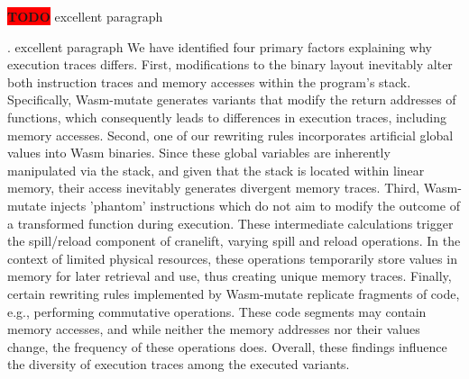 \documentclass[sigplan,screen]{acmart}
\newcommand*\badge[1]{ \colorbox{red}{\color{white}#1}}
\newcommand{\tool}{Wasm-mutate\xspace}
\newcommand{\wasm}{Wasm\xspace}
\newcommand{\todo}[1]{%
\refstepcounter{todo}
\noindent\textbf{\badge{TODO}} {\color{red}#1}
\addcontentsline{td}{todo}
{\color{red}\thesection.\thetodo\xspace #1}}
\begin{document}
\todo{excellent paragraph}
We have identified four primary factors explaining why execution traces differs.
First, modifications to the binary layout inevitably alter both instruction traces and memory accesses within the program's stack. 
Specifically, \tool generates variants that modify the return addresses of functions, which consequently leads to differences in execution traces, including memory accesses.
Second, one of our rewriting rules incorporates artificial global values into \wasm binaries. 
Since these global variables are inherently manipulated via the stack, and given that the stack is located within linear memory, their access inevitably generates divergent memory traces.
Third, \tool injects 'phantom' instructions which do not aim to modify the outcome of a transformed function during execution. 
These intermediate calculations trigger the spill/reload component of cranelift, varying spill and reload operations. 
In the context of limited physical resources, these operations temporarily store values in memory for later retrieval and use, thus creating unique memory traces.
Finally, certain rewriting rules implemented by \tool replicate fragments of code, e.g., performing commutative operations. 
These code segments may contain memory accesses, and while neither the memory addresses nor their values change, the frequency of these operations does.
Overall, these findings influence the diversity of execution traces among the executed variants. 



\end{document}
